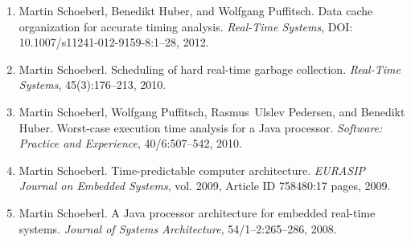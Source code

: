 \documentclass[%
    a4paper,
    12pt, %
    headinclude, footexclude,
    notitlepage,
    headsepline,
    pointlessnumbers,
    ]{scrartcl}
\begin{document}
\begin{enumerate}

\item Martin Schoeberl, Benedikt Huber, and Wolfgang Puffitsch.
 Data cache organization for accurate timing analysis.
 {\em Real-Time Systems}, DOI: 10.1007/s11241-012-9159-8:1--28, 2012.

\item Martin Schoeberl.
Scheduling of hard real-time garbage collection.
{\em Real-Time Systems}, 45(3):176--213, 2010.

\item Martin Schoeberl, Wolfgang Puffitsch, Rasmus~Ulslev
    Pedersen, and Benedikt Huber. Worst-case execution time
  analysis for a {Java} processor. {\em Software: Practice and
  Experience}, 40/6:507--542, 2010.

\item Martin Schoeberl. Time-predictable computer architecture.
    {\em EURASIP Journal on Embedded Systems}, vol. 2009, Article
    ID 758480:17 pages, 2009.
    
\item Martin Schoeberl. A Java processor architecture for
    embedded real-time systems. {\em Journal of Systems
    Architecture}, 54/1--2:265--286, 2008.

\end{enumerate}
\end{document}
